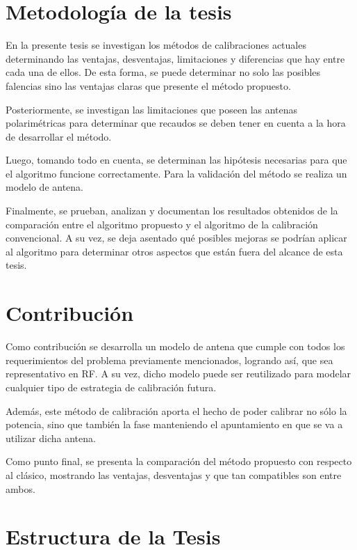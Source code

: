 \section{Metodología de la tesis} \label{sc:methodology}

En la presente tesis se investigan los métodos de calibraciones actuales determinando las ventajas, desventajas, limitaciones
y diferencias que hay entre cada una de ellos. De esta forma, se puede determinar no solo las posibles falencias sino las 
ventajas claras que presente el método propuesto.

Posteriormente, se investigan las limitaciones que poseen las antenas polarimétricas para determinar que recaudos
se deben tener en cuenta a la hora de desarrollar el método.

Luego, tomando todo en cuenta, se determinan las hipótesis necesarias para que el algoritmo funcione correctamente. Para
la validación del método se realiza un modelo de antena.

Finalmente, se prueban, analizan y documentan los resultados obtenidos de la comparación entre el algoritmo propuesto
y el algoritmo de la calibración convencional. A su vez, se deja asentado qué posibles mejoras se podrían aplicar al
algoritmo para determinar otros aspectos que están fuera del alcance de esta tesis.

\section{Contribución} \label{sc:contribution}

Como contribución se desarrolla un modelo de antena que cumple con todos los requerimientos del problema previamente
mencionados, logrando así, que sea representativo en RF. A su vez, dicho modelo puede ser reutilizado para modelar cualquier 
tipo de estrategia de calibración futura.

Además, este método de calibración aporta el hecho de poder calibrar no sólo la potencia, sino que también la fase
manteniendo el apuntamiento en que se va a utilizar dicha antena.

Como punto final, se presenta la comparación del método propuesto con respecto al clásico, mostrando las ventajas, 
desventajas y que tan compatibles son entre ambos.


\section{Estructura de la Tesis} \label{sc:structure}

